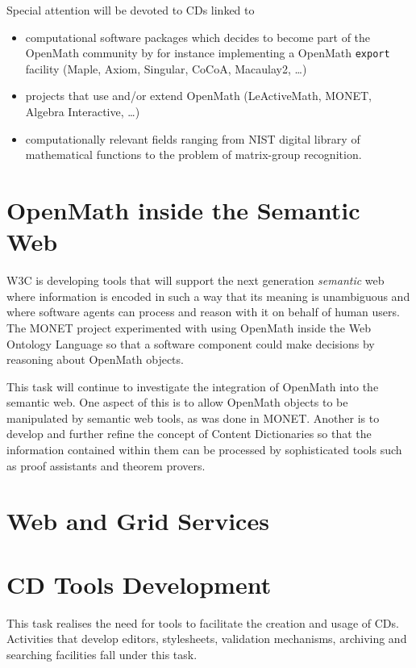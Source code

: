 \documentclass[draft]{artikel3}
\begin{document}
Special attention will be devoted to CDs linked to 
\begin{itemize}
  
\item computational software packages which decides to become part of
  the OpenMath community by for instance implementing a OpenMath
  \texttt{export} facility (Maple, Axiom, Singular, CoCoA, Macaulay2,
  \ldots)
  
\item projects that use and/or extend OpenMath (LeActiveMath, MONET,
  Algebra Interactive, \ldots)
  
\item computationally relevant fields ranging from NIST digital
  library of mathematical functions to the problem of matrix-group
  recognition.

\end{itemize}

\section{OpenMath inside the Semantic Web}

W3C is developing tools that will support the next generation
\emph{semantic} web where information is encoded in such a way that
its meaning is unambiguous and where software agents can process and
reason with it on behalf of human users.  The MONET project
experimented with using OpenMath inside the Web Ontology Language so
that a software component could make decisions by reasoning about
OpenMath objects.

This task will continue to investigate the integration of OpenMath
into the semantic web.  One aspect of this is to allow OpenMath
objects to be manipulated by semantic web tools, as was done in MONET.
Another is to develop and further refine the concept of Content
Dictionaries so that the information contained within them can be
processed by sophisticated tools such as proof assistants and theorem
provers.

\section{Web and Grid Services}


\section{CD Tools Development} 
\label{tools}

This task realises the need for tools to facilitate the creation and
usage of CDs. Activities that develop editors, stylesheets, validation
mechanisms, archiving and searching facilities fall under this task.
\end{document}
